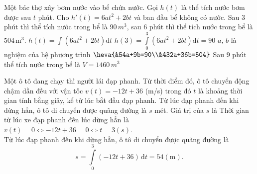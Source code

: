 \begin{ex}%

	Một bác thợ xây bơm nước vào bể chứa nước. Gọi $h(t)$ là thể tích nước bơm được sau $t$ phút. Cho $h'(t)=6a t^2+2b t$ và ban đầu bể không có nước. Sau $3$ phút thì thể tích nước trong bể là $90\,m^3$, sau $6$ phút thì thể tích nước trong bể là $504\,\mathrm{m}^3$. 
	\choiceTF
	{\True $h(t)=\displaystyle\int\left(6a t^2+2b t\right) \mathrm{d} t$ }
	{\True $h(3)=\displaystyle\int\limits_0^3\left(6a t^2+2b t\right) \mathrm{d} t=90$ }
	{\True $a$, $b$ là nghiệm của hệ phương trình $\heva{&54a+9b=90\\&432a+36b=504}$ }
	{ Sau $9$ phút thể tích nước trong bể là $V=1460 \,m^3$ }
\end{ex}

\begin{bt}%
	Một ô tô đang chạy thì người lái đạp phanh. Từ thời điểm đó, ô tô chuyển động chậm dần đều với vận tốc $v(t)=-12 t+36$ (m/s) trong đó $t$ là khoảng thời gian tính bằng giây, kể từ lúc bắt đầu đạp phanh. Từ lúc đạp phanh đến khi dừng hẳn, ô tô di chuyển được quãng đường là $s$ mét. Giá trị của $s$ là
	\loigiai
	{Thời gian từ lúc xe đạp phanh đến lúc dừng hẳn là $v(t)=0 \Leftrightarrow-12 t+36=0 \Leftrightarrow t=3(s)$.\\
		Từ lúc đạp phanh đến khi dừng hẳn, ô tô di chuyển được quãng đường là $$s=\displaystyle\int\limits_0^3(-12 t+36) \mathrm{\,d}t=54 (\text{m}).$$
	}
\end{bt}

